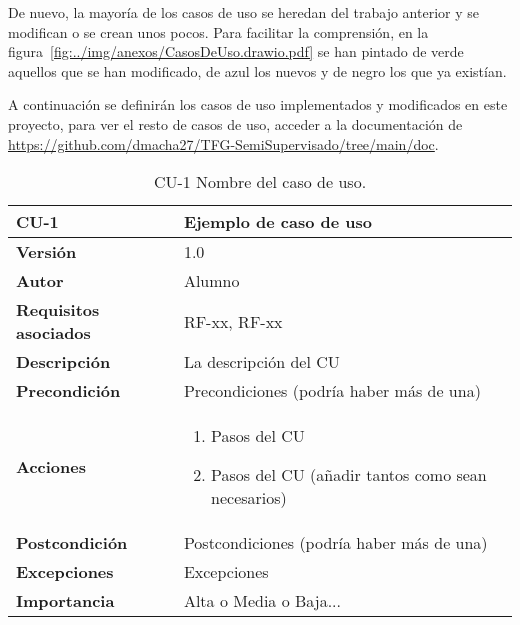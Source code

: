 De nuevo, la mayoría de los casos de uso se heredan del trabajo anterior y se modifican o se crean unos pocos. Para facilitar la comprensión, en la figura~\ref{fig:../img/anexos/CasosDeUso.drawio.pdf} se han pintado de verde aquellos que se han modificado, de azul los nuevos y de negro los que ya existían.


A continuación se definirán los casos de uso implementados y modificados en este proyecto, para ver el resto de casos de uso, acceder a la documentación de \url{https://github.com/dmacha27/TFG-SemiSupervisado/tree/main/doc}.

\begin{table}[p]
	\centering
	\begin{tabularx}{\linewidth}{ p{} p{} }
		\toprule
		\textbf{CU-1}    & \textbf{Ejemplo de caso de uso}\\
		\toprule
		\textbf{Versión}              & 1.0    \\
		\textbf{Autor}                & Alumno \\
		\textbf{Requisitos asociados} & RF-xx, RF-xx \\
		\textbf{Descripción}          & La descripción del CU \\
		\textbf{Precondición}         & Precondiciones (podría haber más de una) \\
		\textbf{Acciones}             &
		\begin{enumerate}
			\def\labelenumi{\arabic{enumi}.}
			\tightlist
			\item Pasos del CU
			\item Pasos del CU (añadir tantos como sean necesarios)
		\end{enumerate}\\
		\textbf{Postcondición}        & Postcondiciones (podría haber más de una) \\
		\textbf{Excepciones}          & Excepciones \\
		\textbf{Importancia}          & Alta o Media o Baja... \\
		\bottomrule
	\end{tabularx}
	\caption{CU-1 Nombre del caso de uso.}
\end{table}
